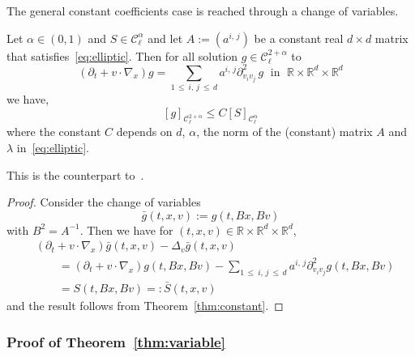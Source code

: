 \documentclass[AHL,Unicode,longabstracts,published]{cedram}
\newcommand{\R}{\mathbb{R}}
\newcommand{\cC}{\mathcal{C}}
\begin{document}
The general constant coefficients case is reached through a change of variables.
\begin{coro}\label{cor:constant}
Let $\alpha \in (0,1)$ and $S \in \cC_\ell^\alpha$ and let $A:=(a^{i,\,j})$ be a constant real $d \times d$ matrix that satisfies~\eqref{eq:elliptic}. Then for all solution $g \in \cC_\ell^{2+\alpha}$ to
\[
(\partial_t + v \cdot \nabla_x) g = \sum_{1\,\le\:i,\,j\:\le\, d} a^{i,\,j} \partial^2_{v_i v_j}\,g \; \text{ in }\;  \R \times \R^d
\times \R^d
\]
we have,
\[
[g]_{\cC_\ell^{2+\alpha}} \le C [S]_{\cC_\ell^{\alpha}}
\]
where the constant $C$ depends on $d$, $\alpha$, the norm of the (constant) matrix $A$ and $\lambda$ in~\eqref{eq:elliptic}.
\end{coro}
\goodbreak

\begin{rema}
This is the counterpart to~\cite[Theorem~8.9.1, p.~127]{krylov1996}.
\end{rema}


\begin{proof}
Consider the change of variables
\[
\bar g(t,x,v) := g(t,B x,B v)
\]
with $B^2=A^{-1}$. Then we have for $(t,x,v) \in \R \times \R^d \times \R^d$,
\begin{align*}
& (\partial_t + v \cdot \nabla_x) \bar g (t,x,v) - \Delta_v \bar g(t,x,v) \\
&\qquad = (\partial_t + v \cdot \nabla_x) g (t,B x,B v) - \sum_{1\,\le\:i,\,j\:\le\,d} a^{i,\,j} \partial^2_{v_i v_j} g(t,B x, B v) \\
&\qquad = S(t,Bx,Bv) =: \bar S (t,x,v)
\end{align*}
and the result follows from Theorem~\ref{thm:constant}.
\end{proof}


\subsubsection{Proof of Theorem~\ref{thm:variable}}
\end{document}
